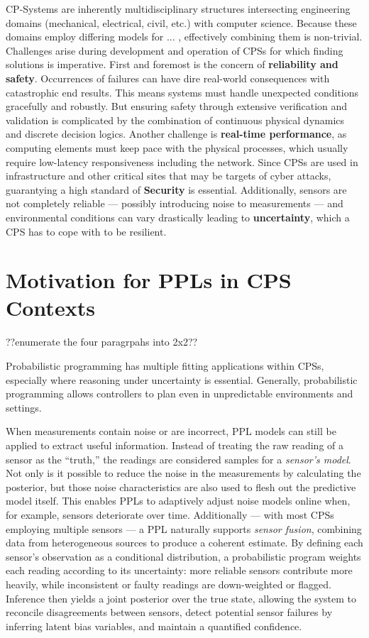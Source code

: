 \documentclass[11pt]{report}
\begin{document}
CP-Systems are inherently multidisciplinary structures intersecting engineering domains (mechanical, electrical, civil, etc.) with computer science.
Because these domains employ differing models for ... , effectively combining them is non-trivial. Challenges arise during development and operation of CPSs for which
finding solutions is imperative. \cite{cpsChallengesAndFuture} First and foremost is the concern of \textbf{reliability and safety}. Occurrences of failures can have dire real-world
consequences with catastrophic end results. This means systems must handle unexpected conditions gracefully and robustly. But ensuring safety through extensive verification 
and validation is complicated by the combination of continuous physical dynamics and discrete decision logics. Another challenge is \textbf{real-time performance}, as computing
elements must keep pace with the physical processes, which usually require low-latency responsiveness including the network. Since CPSs are used in infrastructure and other
critical sites that may be targets of cyber attacks, guarantying a high standard of \textbf{Security} is essential. Additionally, sensors are not completely reliable — 
possibly introducing noise to measurements — and environmental conditions can vary drastically leading to \textbf{uncertainty}, which a CPS has to cope with to be resilient. \cite{cpsProbabilisticRobotics}

\section{Motivation for PPLs in CPS Contexts}
??enumerate the four paragrpahs into 2x2??

Probabilistic programming has multiple fitting applications within CPSs, especially where reasoning under uncertainty is essential. Generally, probabilistic programming
allows controllers to plan even in unpredictable environments and settings.

When measurements contain noise or are incorrect, PPL models can still be applied to extract useful information. Instead of treating the raw reading of a sensor as the “truth,”
the readings are considered samples for a \textit{sensor’s model}. Not only is it possible to reduce the noise in the measurements by calculating the posterior, 
but those noise characteristics are also used to flesh out the predictive model itself.
This enables PPLs to adaptively adjust noise models online when, for example, sensors deteriorate over time.
Additionally — with most CPSs employing multiple sensors — a PPL naturally supports \textit{sensor fusion}, \cite{cpsSensorFusion} combining data from heterogeneous sources
to produce a coherent estimate. By defining each sensor's observation as a conditional distribution, a probabilistic program
weights each reading according to its uncertainty: more reliable sensors contribute more heavily, while inconsistent or faulty readings are down-weighted or flagged. 
Inference then yields a joint posterior over the true state, allowing the system to reconcile disagreements between sensors, detect potential sensor failures by inferring 
latent bias variables, and maintain a quantified confidence.\\
\end{document}
